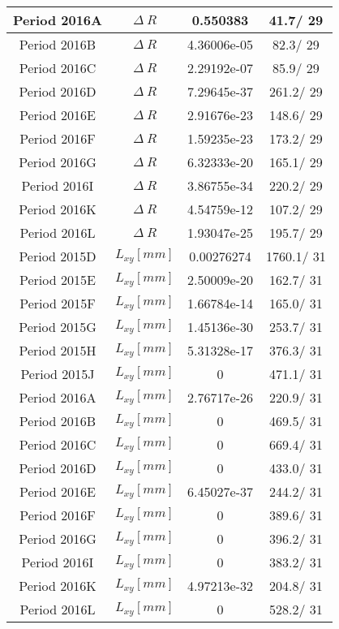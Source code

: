 \documentclass{article}
\begin{document}
\begin{longtable}{c|c|c|c}
\hline
 Period 2016A & $\Delta~R$ & 0.550383 &  41.7/ 29\\
\hline
 Period 2016B & $\Delta~R$ & 4.36006e-05 &  82.3/ 29\\
\hline
 Period 2016C & $\Delta~R$ & 2.29192e-07 &  85.9/ 29\\
\hline
 Period 2016D & $\Delta~R$ & 7.29645e-37 & 261.2/ 29\\
\hline
 Period 2016E & $\Delta~R$ & 2.91676e-23 & 148.6/ 29\\
\hline
 Period 2016F & $\Delta~R$ & 1.59235e-23 & 173.2/ 29\\
\hline
 Period 2016G & $\Delta~R$ & 6.32333e-20 & 165.1/ 29\\
\hline
 Period 2016I & $\Delta~R$ & 3.86755e-34 & 220.2/ 29\\
\hline
 Period 2016K & $\Delta~R$ & 4.54759e-12 & 107.2/ 29\\
\hline
 Period 2016L & $\Delta~R$ & 1.93047e-25 & 195.7/ 29\\
\hline
 Period 2015D & $L_{xy} [mm]$ & 0.00276274 & 1760.1/ 31\\
\hline
 Period 2015E & $L_{xy} [mm]$ & 2.50009e-20 & 162.7/ 31\\
\hline
 Period 2015F & $L_{xy} [mm]$ & 1.66784e-14 & 165.0/ 31\\
\hline
 Period 2015G & $L_{xy} [mm]$ & 1.45136e-30 & 253.7/ 31\\
\hline
 Period 2015H & $L_{xy} [mm]$ & 5.31328e-17 & 376.3/ 31\\
\hline
 Period 2015J & $L_{xy} [mm]$ & 0 & 471.1/ 31\\
\hline
 Period 2016A & $L_{xy} [mm]$ & 2.76717e-26 & 220.9/ 31\\
\hline
 Period 2016B & $L_{xy} [mm]$ & 0 & 469.5/ 31\\
\hline
 Period 2016C & $L_{xy} [mm]$ & 0 & 669.4/ 31\\
\hline
 Period 2016D & $L_{xy} [mm]$ & 0 & 433.0/ 31\\
\hline
 Period 2016E & $L_{xy} [mm]$ & 6.45027e-37 & 244.2/ 31\\
\hline
 Period 2016F & $L_{xy} [mm]$ & 0 & 389.6/ 31\\
\hline
 Period 2016G & $L_{xy} [mm]$ & 0 & 396.2/ 31\\
\hline
 Period 2016I & $L_{xy} [mm]$ & 0 & 383.2/ 31\\
\hline
 Period 2016K & $L_{xy} [mm]$ & 4.97213e-32 & 204.8/ 31\\
\hline
 Period 2016L & $L_{xy} [mm]$ & 0 & 528.2/ 31\\

\end{longtable}
\end{document}
